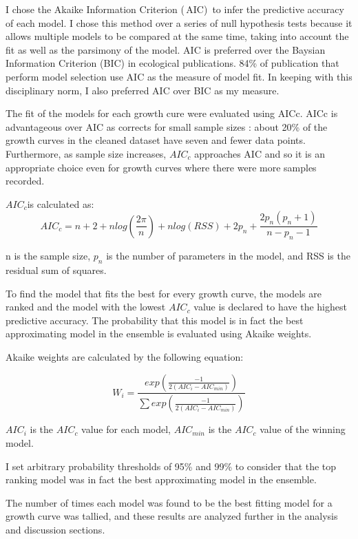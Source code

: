 \documentclass[11pt]{article}
\begin{document}
  I chose the Akaike Information Criterion (\,AIC)\, to infer the predictive accuracy of each model. I chose this method over a series of null hypothesis tests because it  allows multiple models to be compared at the same time, taking into account  the fit as well as the parsimony of the model. AIC is preferred over the Baysian Information Criterion (BIC) in ecological publications. 84\% of publication that perform model selection use AIC as the measure of model fit. In keeping with this disciplinary norm, I also preferred AIC over BIC as my measure.

  The fit of the models for each growth cure were evaluated using AICc. AICc is advantageous over AIC as corrects for small sample sizes \citep{Johnson2004}: about 20\% of the growth curves in the cleaned dataset have seven and fewer data points. Furthermore, as sample size increases, $AIC_{c}$  approaches AIC  \citep{Symonds2010} and so it is an appropriate choice even for growth curves where there were more samples recorded.

  $AIC_{c}$is calculated as:
  \begin{equation} %
    AIC_{c} = n +2+nlog(\frac{2\pi }{n})+nlog(RSS)+2p_{n}+\frac{2p_{n}(p_{n}+1)}{n-p_{n}-1}
  \end{equation}
 
  n is the sample size, $p_{n}$ is the number of parameters in the model, and RSS is the residual sum of squares.

  To find the model that fits the best for every growth curve, the models are ranked and the model with the lowest $AIC_{c}$ value is declared to have the highest predictive accuracy. The probability that this model is in fact the best approximating model in the ensemble is evaluated using Akaike weights.

  Akaike weights are calculated by the following equation:

  \begin{equation} %
    W_{i} = \frac{exp(\frac{-1}{2(AIC_{i}- AIC_{min})})}{\sum exp(\frac{-1}{2(AIC_{i}- AIC_{min})})}
  \end{equation}

  $AIC_{i}$ is the $AIC_{c}$ value for each model, $AIC_{min}$ is the $AIC_{c}$ value of the winning model.

  I set arbitrary probability thresholds of 95\% and 99\% to consider that the top ranking model was in fact the best approximating model in the ensemble. 

 The number of times each model was found to be the best fitting model for a growth curve was tallied, and these results are analyzed further in the analysis and discussion sections.
\end{document}
